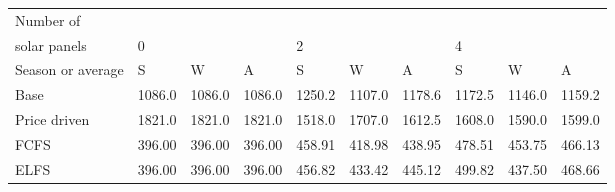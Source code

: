\begin{table}[h] 
\centering 
\begin{tabular}{l|lll|lll|lll}Number of \\ solar panels&0& & &2& & &4& & \\ \hline 
Season or average & S & W & A & S & W & A & S & W & A \\ \hline 
Base&1086.0&1086.0&1086.0&1250.2&1107.0&1178.6&1172.5&1146.0&1159.2 \\ 
Price driven&1821.0&1821.0&1821.0&1518.0&1707.0&1612.5&1608.0&1590.0&1599.0 \\ 
FCFS&396.00&396.00&396.00&458.91&418.98&438.95&478.51&453.75&466.13 \\ 
ELFS&396.00&396.00&396.00&456.82&433.42&445.12&499.82&437.50&468.66 \\ 
\end{tabular} 
\end{table}